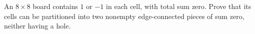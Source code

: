 An $8\times8$ board contains $1$ or $-1$ in each cell, with total sum zero. Prove that its cells can be partitioned into two nonempty edge-connected pieces of sum zero, neither having a hole.
